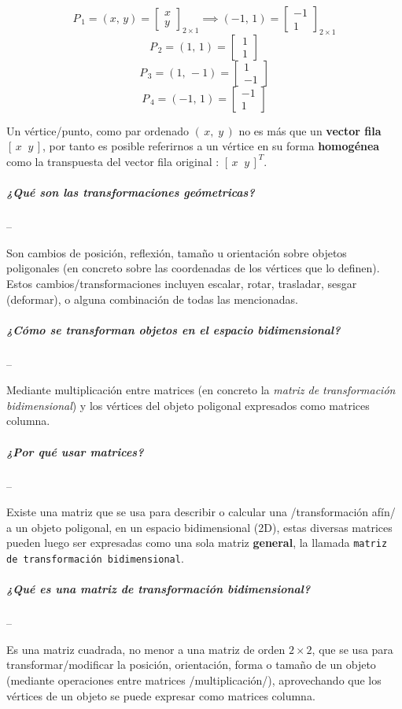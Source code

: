 \documentclass[10pt, twocolumn, landscape, a4paper]{article}
\begin{document}
$$P_{\,1} = (x,\,y) = \begin{bmatrix}x \\ y \end{bmatrix}_{2 \times 1} \implies (-1,\,1) = \begin{bmatrix} -1 \\ 1 \end{bmatrix}_{2 \times 1}$$
$$P_{\,2} = (1,\,1) = \begin{bmatrix} \,1 \\ \,1 \end{bmatrix}$$
$$P_{\,3} = (1,\,-1) = \begin{bmatrix} 1 \\ -1 \end{bmatrix}$$
$$P_{\,4} = (-1,\,1) = \begin{bmatrix} -1 \\ 1 \end{bmatrix}$$

\noindent Un vértice/punto, como par ordenado $(\,x,\;y\,)$ no es más que un \textbf{vector fila} $[\,x\;\;y\,]$, por tanto es posible referirnos a un vértice en su forma \textbf{homogénea} como la transpuesta del vector fila original : $[\,x\;\;y\,]^{T}$.

\subparagraph*{¿Qué son las transformaciones geómetricas?} --

\noindent Son cambios de posición, reflexión, tamaño u orientación sobre objetos poligonales (en concreto sobre las coordenadas de los vértices que lo definen). Estos cambios/transformaciones incluyen escalar, rotar, trasladar, sesgar (deformar), o alguna combinación de todas las mencionadas.

\subparagraph*{¿Cómo se transforman objetos en el espacio bidimensional?} --

\noindent Mediante multiplicación entre matrices (en concreto la \emph{matriz de transformación bidimensional}) y los vértices del objeto poligonal expresados como matrices columna.

\subparagraph*{¿Por qué usar matrices?} --

\noindent Existe una matriz que se usa para describir o calcular una /transformación afín/ a un objeto poligonal, en un espacio bidimensional (2D), estas diversas matrices pueden luego ser expresadas como una sola matriz \textbf{general}, la llamada {\tt matriz de transformación bidimensional}. 

\subparagraph*{¿Qué es una matriz de transformación bidimensional?} --

\noindent Es una matriz cuadrada, no menor a una matriz de orden $2{\times}2$, que se usa para transformar/modificar la posición, orientación, forma o tamaño de un objeto (mediante operaciones entre matrices /multiplicación/), aprovechando que los vértices de un objeto se puede expresar como matrices columna. \\
\end{document}
